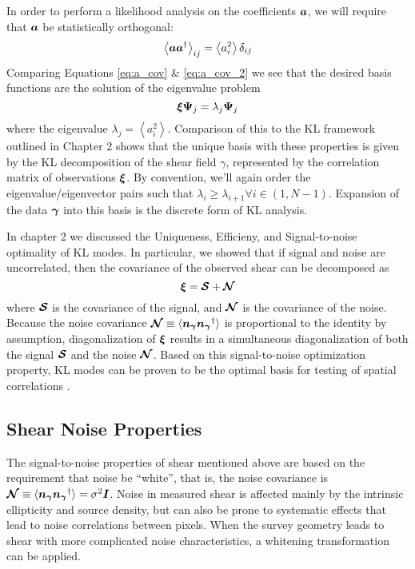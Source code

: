 In order to perform a likelihood analysis on the coefficients
$\boldsymbol{a}$, we will require that $\boldsymbol{a}$ be statistically orthogonal:
\begin{equation}
  \label{eq:a_cov_2}
  \left\langle \boldsymbol{a}\boldsymbol{a}^\dagger \right\rangle_{ij}
  = \left\langle a_i^2 \right\rangle \delta_{ij}
\end{equation}
Comparing Equations \ref{eq:a_cov} \& \ref{eq:a_cov_2} we see that the desired
basis functions are the solution of the eigenvalue problem
\begin{equation}
  \boldsymbol{\xi} \boldsymbol{\Psi}_j = \lambda_j \boldsymbol{\Psi}_j
\end{equation}
where the eigenvalue $\lambda_j = \left\langle a_i^2 \right\rangle$.
Comparison of this to the KL framework outlined in Chapter 2 shows that
the unique basis with these properties is given by the KL decomposition
of the shear field $\gamma$, represented by the correlation matrix
of observations $\boldsymbol{\xi}$.
By convention, we'll again order the eigenvalue/eigenvector pairs such that
$\lambda_i \ge \lambda_{i+1} \forall i\in(1, N-1)$.
Expansion of the data $\boldsymbol{\gamma}$ into this basis is the discrete form
of KL analysis.

In chapter 2 we discussed the Uniqueness, Efficieny, and Signal-to-noise
optimality of KL modes.  In particular, we showed that
if signal and noise are uncorrelated, then the covariance of the observed
shear can be decomposed as
\begin{equation}
  \boldsymbol{\xi} = \boldsymbol{\mathcal{S}} + \boldsymbol{\mathcal{N}}
\end{equation}
where $\boldsymbol{\mathcal{S}}$ is the covariance of the signal, and
$\boldsymbol{\mathcal{N}}$ is the covariance of the noise.
Because the noise covariance $\boldsymbol{\mathcal{N}} \equiv 
\langle\boldsymbol{n_\gamma}\boldsymbol{n_\gamma}^\dagger\rangle$ is proportional
to the identity by assumption, diagonalization of $\boldsymbol{\xi}$ results
in a simultaneous diagonalization of both the signal $\boldsymbol{\mathcal{S}}$
and the noise $\boldsymbol{\mathcal{N}}$.  Based on this signal-to-noise
optimization property, KL modes can be proven to be the optimal basis
for testing of spatial correlations \citep[see Appendix A of][]{Vogeley96}.

\subsection{Shear Noise Properties}
\label{sec:whitening}
The signal-to-noise properties of shear mentioned above are based on the 
requirement that noise be ``white'', that is, the noise covariance is
$\boldsymbol{\mathcal{N}} \equiv 
\langle\boldsymbol{n_\gamma}\boldsymbol{n_\gamma}^\dagger\rangle
= \sigma^2 \boldsymbol{I}$.  Noise in measured shear is affected mainly by the
intrinsic ellipticity and source density, but can also be prone to systematic
effects that lead to noise correlations between pixels.  When the survey
geometry leads to shear with more complicated noise characteristics, a
whitening transformation can be applied.

